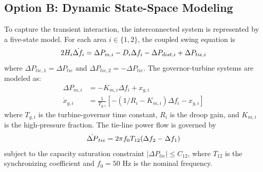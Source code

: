 \documentclass[lettersize,journal]{IEEEtran}
\begin{document}
\subsection{Option B: Dynamic State-Space Modeling}
To capture the transient interaction, the interconnected system is represented by a five-state model. For each area $i \in \{1, 2\}$, the coupled swing equation is
\vspace{-0.15cm}
\begin{equation}
2 H_i \dot{\Delta f_i} = \Delta P_{m,i} - D_i \Delta f_i - \Delta P_{dist,i} + \Delta P_{tie,i}
\vspace{-0.15cm}
\end{equation}
where $\Delta P_{tie,1} = \Delta P_{tie}$ and $\Delta P_{tie,2} = -\Delta P_{tie}$. The governor-turbine systems are modeled as:
\vspace{-0.15cm}
\begin{subequations}
\begin{align}
\Delta P_{m,i} &= - K_{m,i} \Delta f_i + x_{g,i} \\
\dot{x}_{g,i} &= \frac{1}{T_{g,i}} \left[ - (1/R_i - K_{m,i}) \Delta f_i - x_{g,i} \right]
\end{align}
\end{subequations}
where $T_{g,i}$ is the turbine-governor time constant, $R_i$ is the droop gain, and $K_{m,i}$ is the high-pressure fraction. The tie-line power flow is governed by
\vspace{-0.15cm}
\begin{equation}
\dot{\Delta P}_{tie} = 2 \pi f_0 T_{12} (\Delta f_2 - \Delta f_1)
\vspace{-0.15cm}
\end{equation}
subject to the capacity saturation constraint $|\Delta P_{tie}| \leq C_{12}$, where $T_{12}$ is the synchronizing coefficient and $f_0 = 50$ Hz is the nominal frequency.
\end{document}
